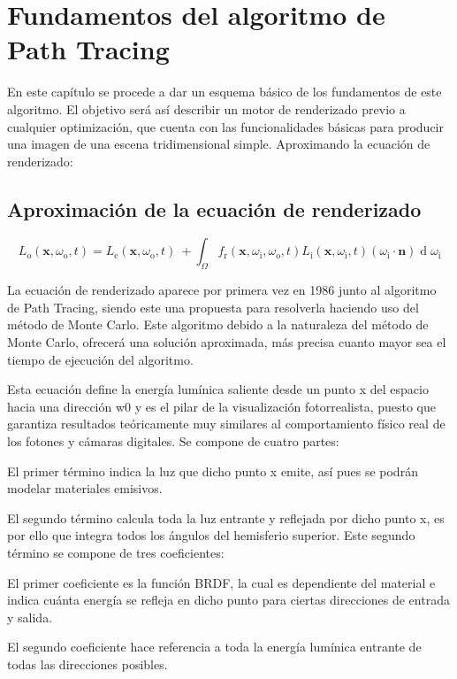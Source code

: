 \chapter{Fundamentos del algoritmo de Path Tracing}
	

En este capítulo se procede a dar un esquema básico de los fundamentos de este algoritmo. El objetivo será así describir un motor de renderizado previo a cualquier optimización, que cuenta con las funcionalidades básicas para producir una imagen de una escena tridimensional simple. 
Aproximando la ecuación de renderizado:

	\section{Aproximación de la ecuación de renderizado}
\[
{\displaystyle L_{\text{o}}(\mathbf {x} ,\omega _{\text{o}} ,t)=L_{\text{e}}(\mathbf {x} ,\omega _{\text{o}},t)\ +\int _{\Omega }f_{\text{r}}(\mathbf {x} ,\omega _{\text{i}},\omega _{\text{o}},t)L_{\text{i}}(\mathbf {x} ,\omega _{\text{i}},t)(\omega _{\text{i}}\cdot \mathbf {n} )\operatorname {d} \omega _{\text{i}}}
\]


La ecuación de renderizado aparece por primera vez en 1986 junto al algoritmo de Path Tracing, siendo este una propuesta para resolverla haciendo uso del método de Monte Carlo. Este algoritmo debido a la naturaleza del método de Monte Carlo, ofrecerá una solución aproximada, más precisa cuanto mayor sea el tiempo de ejecución del algoritmo. 

Esta ecuación define la energía lumínica saliente desde un punto x del espacio hacia una dirección w0 y es el pilar de la visualización fotorrealista, puesto que garantiza resultados teóricamente muy similares al comportamiento físico real de los fotones y cámaras digitales. Se compone de cuatro partes:

El primer término indica la luz que dicho punto x emite, así pues se podrán modelar materiales emisivos.

El segundo término calcula toda la luz entrante y reflejada por dicho punto x, es por ello que integra todos los ángulos del hemisferio superior. Este segundo término se compone de tres coeficientes:

El primer coeficiente es la función BRDF, la cual es dependiente del material e indica cuánta energía se refleja en dicho punto para ciertas direcciones de entrada y salida.

El segundo coeficiente hace referencia a toda la energía lumínica entrante de todas las direcciones posibles.

